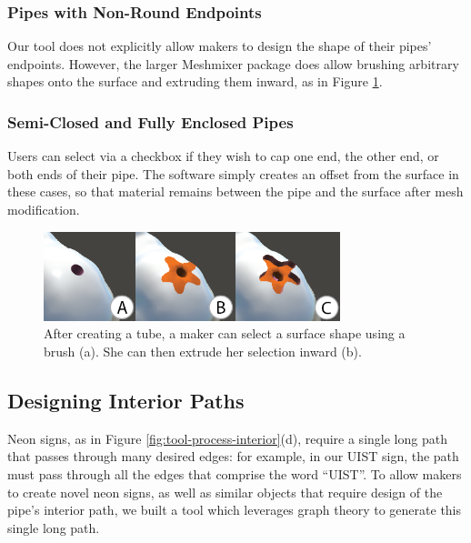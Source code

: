 \subsubsection{Pipes with Non-Round Endpoints}
Our tool does not explicitly allow makers to design the shape of their pipes' endpoints.  However, the larger Meshmixer package does allow brushing arbitrary shapes onto the surface and extruding them inward, as in Figure \ref{fig:meshmixer-endpoint}. 

\subsubsection{Semi-Closed and Fully Enclosed Pipes}
Users can select via a checkbox if they wish to cap one end, the other end, or both ends of their pipe.  The software simply creates an offset from the surface in these cases, so that material remains between the pipe and the surface after mesh modification.

\begin{figure}[h!]
\centering
    \includegraphics[width=3.4in]{figures/meshmixer-endpoint.png}
\caption{After creating a tube, a maker can select a surface shape using a brush (a).  She can then extrude her selection inward (b).}
\label{fig:meshmixer-endpoint}
\end{figure}

\subsection{Designing Interior Paths}



Neon signs, as in Figure \ref{fig:tool-process-interior}(d), require a single long path that passes through many desired edges: for example, in our UIST sign, the path must pass through all the edges that comprise the word ``UIST''.  To allow makers to create novel neon signs, as well as similar objects that require design of the pipe's interior path, we built a tool which leverages graph theory to generate this single long path.

